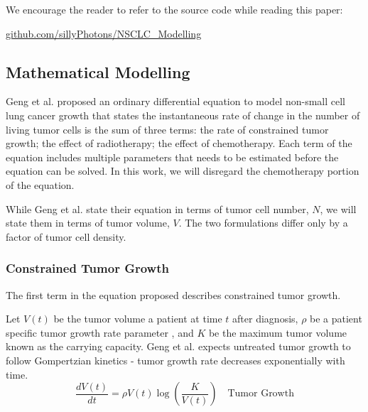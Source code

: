 \documentclass[letterpaper
, superscriptaddress
, twocolumn
, aps
]{revtex4}
\begin{document}
We encourage the reader to refer to the source code while reading this paper:
\begin{center}
	\href{https://github.com/sillyPhotons/NSCLC_Modelling}{github.com/sillyPhotons/NSCLC\_Modelling}
\end{center}

\subsection{Mathematical Modelling}

Geng et al. proposed an ordinary differential equation to model non-small cell lung cancer growth that states the instantaneous rate of change in the number of living tumor cells is the sum of three terms: the rate of constrained tumor growth; the effect of radiotherapy; the effect of chemotherapy. Each term of the equation includes multiple parameters that needs to be estimated before the equation can be solved. In this work, we will disregard the chemotherapy portion of the equation.

While Geng et al. state their equation in terms of tumor cell number, $N$, we will state them in terms of tumor volume, $V$. The two formulations differ only by a factor of tumor cell density.

\subsubsection{Constrained Tumor Growth}
The first term in the equation proposed describes constrained tumor growth.

Let $V(t)$ be the tumor volume a patient at time $t$ after diagnosis, $\rho$ be a patient specific tumor growth rate parameter 
, and $K$ be the maximum tumor volume known as the carrying capacity. Geng et al. expects untreated tumor growth to follow Gompertzian kinetics - tumor growth rate decreases exponentially with time.
\begin{equation} \label{1}
\frac{dV(t)}{dt} = \rho V(t) \log \left( \frac{K}{V(t)}\right) \quad \text{Tumor Growth}
\end{equation}  
\end{document}
